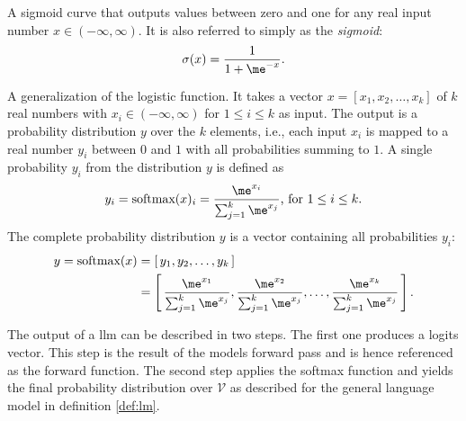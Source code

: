     \begin{definition}
    \label{def:sigmoid}
        A sigmoid curve that outputs values between zero and one for any real input number $x \in (-\infty,\infty)$.
        It is also referred to simply as the \emph{sigmoid}:
        \begin{equation}
            \sigma(x) = \frac{1}{1+\me^{-x}} \text{.}
        \end{equation}
    \end{definition}

    \begin{definition}
        A generalization of the logistic function.
        It takes a vector $x=[x_1,x_2,\dots,x_k]$ of $k$ real numbers with $x_i \in (-\infty,\infty)$ for $1 \leq i \leq k$ as input.
        The output is a probability distribution $y$ over the $k$ elements, i.e., each input $x_i$ is mapped to a real number $y_i$ between $0$ and $1$ with all probabilities summing to $1$.
        A single probability $y_i$ from the distribution $y$ is defined as
        \begin{equation}
            y_i = \text{softmax}(x)_i = \frac{\me^{x_i}}{\sum_{j=1}^{k} \me^{x_j}} \text{, for } 1 \leq i \leq k \text{.}
        \end{equation}
        The complete probability distribution $y$ is a vector containing all probabilities $y_i$:
        \begin{equation}
        \begin{split}
            y = \text{softmax}(x) &= [ \, y_1,y_2,\dots,y_k \, ] \\
                &= \left[ \, \frac{\me^{x_1}}{\sum_{j=1}^{k} \me^{x_j}},  \frac{\me^{x_2}}{\sum_{j=1}^{k} \me^{x_j}}, \dots, \frac{\me^{x_k}}{\sum_{j=1}^{k} \me^{x_j}} \, \right] \text{.}
        \end{split}
        \end{equation}
    \end{definition}

    The output of a \ac{llm} can be described in two steps.
    The first one produces a logits vector.
    This step is the result of the models forward pass and is hence referenced as the forward function.
    The second step applies the softmax function and yields the final probability distribution over $\mathcal{V}$ as described for the general language model in definition \ref{def:lm}.

